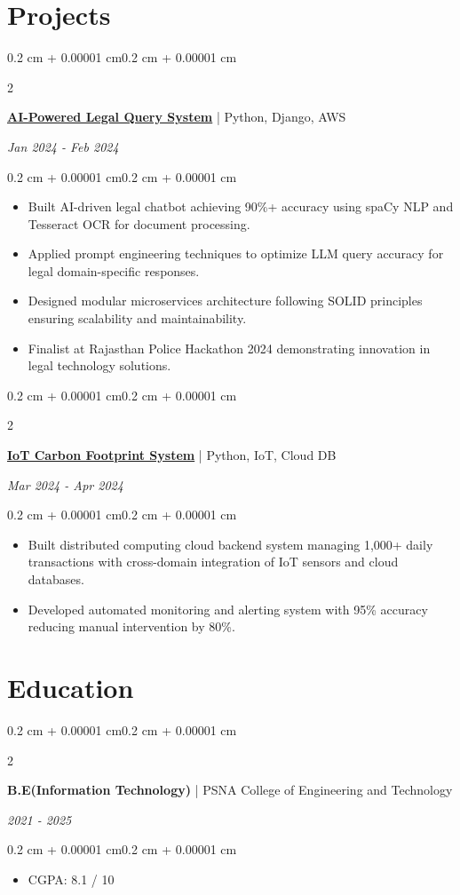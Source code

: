 \documentclass[10pt, letterpaper]{article}
\newenvironment{highlights}{
    \begin{itemize}[
        topsep=0.05cm,
        parsep=0pt,
        partopsep=0pt,
        itemsep=1pt,
        leftmargin=0.4 cm + 10pt
    ]
}{
    \end{itemize}
}
\newenvironment{onecolentry}{
    \begin{adjustwidth}{0.2 cm + 0.00001 cm}{0.2 cm + 0.00001 cm}
}{
    \end{adjustwidth}
}
\newenvironment{twocolentry}[2][]{
    \onecolentry
    \def\secondColumn{#2}
    \setcolumnwidth{\fill, 4.5 cm}
    \begin{paracol}{2}
}{
    \switchcolumn \raggedleft \secondColumn
    \end{paracol}
    \endonecolentry
}
\begin{document}
\section{Projects}

\begin{twocolentry}{\textit{Jan 2024 - Feb 2024}}
\textbf{\href{https://github.com/santhoshkumars2004/LegalAssist}{AI-Powered Legal Query System}} | Python, Django, AWS
\end{twocolentry}
\begin{onecolentry}
\begin{highlights}
\item Built AI-driven legal chatbot achieving 90\%+ accuracy using spaCy NLP and Tesseract OCR for document processing.
\item Applied prompt engineering techniques to optimize LLM query accuracy for legal domain-specific responses.
\item Designed modular microservices architecture following SOLID principles ensuring scalability and maintainability.
\item Finalist at Rajasthan Police Hackathon 2024 demonstrating innovation in legal technology solutions.
\end{highlights}
\end{onecolentry}

\begin{twocolentry}{\textit{Mar 2024 - Apr 2024}}
\textbf{\href{https://github.com/santhoshkumars2004/carbon-green}{IoT Carbon Footprint System}} | Python, IoT, Cloud DB
\end{twocolentry}
\begin{onecolentry}
\begin{highlights}
\item Built distributed computing cloud backend system managing 1,000+ daily transactions with cross-domain integration of IoT sensors and cloud databases.
\item Developed automated monitoring and alerting system with 95\% accuracy reducing manual intervention by 80\%.
\end{highlights}
\end{onecolentry}

\section{Education}

\begin{twocolentry}{\textit{2021 - 2025}}
\textbf{B.E(Information Technology)} | PSNA College of Engineering and Technology
\end{twocolentry}
\begin{onecolentry}
\begin{highlights}
\item CGPA: 8.1 / 10
\end{highlights}
\end{onecolentry}
\end{document}

